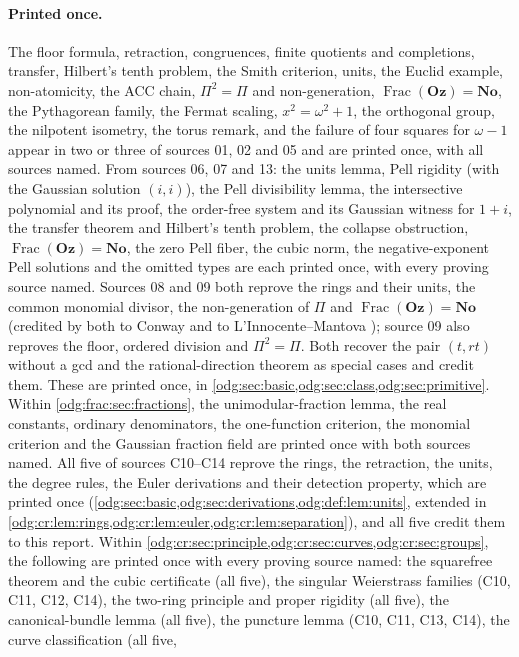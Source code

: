 \documentclass[11pt,oneside]{article}
\numberwithin{equation}{section}
\theoremstyle{definition}
\theoremstyle{remark}
\newcommand{\No}{\mathbf{No}}
\newcommand{\Oz}{\mathbf{Oz}}
\newcommand{\Frac}{\operatorname{Frac}}
\begin{document}
\paragraph{Printed once.} The floor formula, retraction, congruences, finite
quotients and completions, transfer, Hilbert's tenth problem, the Smith
criterion, units, the Euclid example, non-atomicity, the ACC chain,
$\Pi^2=\Pi$ and non-generation, $\Frac(\Oz)=\No$, the Pythagorean family, the
Fermat scaling, $x^2=\omega^2+1$, the orthogonal group, the nilpotent
isometry, the torus remark, and the failure of four squares for $\omega-1$
appear in two or three of sources 01, 02 and 05 and are printed once, with all
sources named. From sources 06, 07 and 13: the units lemma, Pell rigidity
(with the Gaussian solution $(i,i)$), the Pell divisibility lemma, the
intersective polynomial and its proof, the order-free system and its
Gaussian witness for $1+i$, the transfer theorem and Hilbert's tenth problem,
the collapse obstruction, $\Frac(\Oz)=\No$, the zero Pell fiber, the cubic
norm, the negative-exponent Pell solutions and the omitted types are each
printed once, with every proving source named. Sources 08 and 09 both reprove
the rings and their units, the common monomial divisor, the non-generation of
$\Pi$ and $\Frac(\Oz)=\No$ (credited by both to Conway and to
L'Innocente--Mantova \cite[Proposition 2.4.5]{LM}); source 09 also reproves
the floor, ordered division and $\Pi^2=\Pi$. Both recover the pair $(t,rt)$
without a gcd and the rational-direction theorem as special cases and credit
them. These are printed once, in
\cref{odg:sec:basic,odg:sec:class,odg:sec:primitive}. Within
\cref{odg:frac:sec:fractions}, the unimodular-fraction lemma, the real
constants, ordinary denominators, the one-function criterion, the monomial
criterion and the Gaussian fraction field are printed once with both sources
named. All five of sources C10--C14 reprove the rings, the retraction, the units, the
degree rules, the Euler derivations and their detection property, which are printed
once (\cref{odg:sec:basic,odg:sec:derivations,odg:def:lem:units}, extended in
\cref{odg:cr:lem:rings,odg:cr:lem:euler,odg:cr:lem:separation}), and all five credit
them to this report. Within
\cref{odg:cr:sec:principle,odg:cr:sec:curves,odg:cr:sec:groups}, the following are
printed once with every proving source named: the squarefree theorem and the cubic
certificate (all five), the singular Weierstrass families (C10, C11, C12, C14), the
two-ring principle and proper rigidity (all five), the canonical-bundle lemma (all
five), the puncture lemma (C10, C11, C13, C14), the curve classification (all five,
\end{document}
